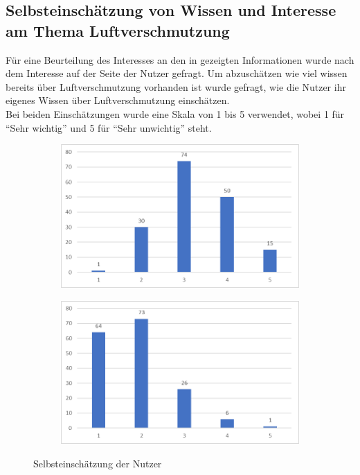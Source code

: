 \subsection{Selbsteinschätzung von Wissen und Interesse am Thema Luftverschmutzung}
Für eine Beurteilung des Interesses an den in \softwarename gezeigten Informationen wurde nach dem Interesse auf der Seite der Nutzer gefragt.
Um abzuschätzen wie viel wissen bereits über Luftverschmutzung vorhanden ist wurde gefragt, wie die Nutzer ihr eigenes Wissen über Luftverschmutzung einschätzen.
\\
Bei beiden Einschätzungen wurde eine Skala von 1 bis 5 verwendet, wobei 1 für \enquote{Sehr wichtig} und 5 für \enquote{Sehr unwichtig} steht.
\\
\begin{figure}[h]
    \begin{subfigure}[c]{0.49\textwidth}
        \centering        
        \includegraphics[scale=0.2]{media/diagram/eigenesWissen.png}
    \end{subfigure}
    \begin{subfigure}[c]{0.49\textwidth}
        \centering        
        \includegraphics[scale=0.2]{media/diagram/WichtigkeitVonInfos.png}
    \end{subfigure}
    \caption{Selbsteinschätzung der Nutzer}
\end{figure}
